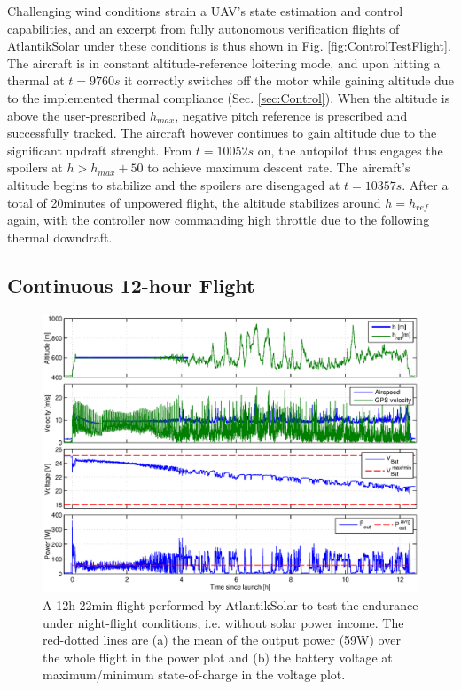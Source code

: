 Challenging wind conditions strain a UAV's state estimation and control capabilities, and an excerpt from fully autonomous verification flights of AtlantikSolar under these conditions is thus shown in Fig. \ref{fig:ControlTestFlight}. The aircraft is in constant altitude-reference loitering mode, and upon hitting a thermal at $t=9760s$ it correctly switches off the motor while gaining altitude due to the implemented thermal compliance (Sec. \ref{sec:Control}). When the altitude is above the user-prescribed $h_{max}$, negative pitch reference is prescribed and successfully tracked. The aircraft however continues to gain altitude due to the significant updraft strenght. From $t=10052s$ on, the autopilot thus engages the spoilers at $h>h_{max}+50$ to achieve maximum descent rate. The aircraft's altitude begins to stabilize and the spoilers are disengaged at $t=10357s$. After a total of 20minutes of unpowered flight, the altitude stabilizes around $h=h_{ref}$ again, with the controller now commanding high throttle due to the following thermal downdraft. 

\subsection{Continuous 12-hour Flight} \label{sec:12hFlight}
  
\begin{figure}[tb]
    \centering
     \includegraphics[width=\linewidth]{images/12hFlight}
    \caption{A 12h 22min flight performed by AtlantikSolar to test the endurance under night-flight conditions, i.e. without solar power income. The red-dotted lines are (a) the mean of the output power (59W) over the whole flight in the power plot and (b) the battery voltage at maximum/minimum state-of-charge in the voltage plot.} 
    \label{fig:12hFlight}
\end{figure}

